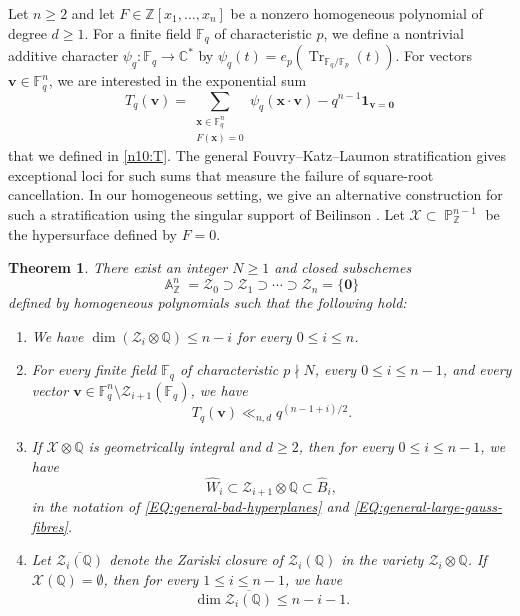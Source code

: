 \documentclass[a4paper,11pt, twoside,reqno]{amsart}
\theoremstyle{plain}
\newtheorem{thm}{Theorem}[section]
\theoremstyle{definition}
\theoremstyle{remark}
\newcommand{\F}{\mathbb{F}}
\newcommand{\bfv}{\bm{v}}
\newcommand{\bfx}{\bm{x}}
\newcommand{\ZZ}{\mathbb{Z}}
\newcommand{\QQ}{\mathbb{Q}}
\DeclareMathOperator{\Tr}{Tr}
\DeclareMathOperator{\A}{\mathbb{A}}
\DeclareMathOperator{\PP}{\mathbb{P}}
\renewcommand{\bar}{\overline}
\renewcommand{\le}{\leqslant}
\renewcommand{\leq}{\leqslant}
\renewcommand{\ge}{\geqslant}
\renewcommand{\geq}{\geqslant}
\newcommand{\FF}{\mathbb{F}}
\newcommand{\CC}{\mathbb{C}}
\newcommand{\cone}{\widehat}
\numberwithin{equation}{section}
\begin{document}
Let $n\geq 2$ and let $F\in\ZZ[x_1,\dots,x_n]$ be a nonzero homogeneous
polynomial of degree $d\geq1$.
For a finite field $\FF_q$ of characteristic $p$,
we define a nontrivial additive character $\psi_q\colon \FF_q\to \CC^\ast$
by $\psi_q(t)=e_p(\Tr_{\FF_q/\FF_p}(t))$.
For vectors $\bfv\in \FF_q^n$, we are interested in the exponential sum
\[
T_q(\bfv)
= \sum_{\substack{\bfx\in\FF_q^n\\F(\bfx)=0}}
\psi_q(\bfx\cdot\bfv)
-q^{n-1}\bm1_{\bfv=\bm0}
\]
that we defined in \eqref{n10:T}.
The general Fouvry--Katz--Laumon stratification \cite[Theorem~1.1]{FK01}
gives exceptional loci for such sums
that measure the failure of square-root cancellation.
In our homogeneous setting,
we give an alternative construction for such a stratification using
the singular support of Beilinson \cite{Bei}.
Let $\mathcal X\subset \PP^{n-1}_{\ZZ}$ be the hypersurface defined by $F=0$.

\begin{thm}\label{n10:ss}
There exist an integer $N\geq1$ and closed subschemes
\[
\A^n_\ZZ=\mathcal Z_0\supset \mathcal Z_1\supset\cdots\supset \mathcal Z_n=\{\bm0\}
\]
defined by homogeneous polynomials such that the following hold:
\begin{enumerate}
\item \label{item:strat-geom-dim-bound}
We have $\dim (\mathcal Z_i \otimes \QQ) \le n-i$ for every $0\le i\le n$.

\item \label{item:strat-fourier-bound}
For every finite field $\FF_q$
of characteristic $p\nmid N$, every $0\leq i\leq n-1$, and every
vector $\bfv\in \FF_q^n \setminus \mathcal Z_{i+1}(\FF_q)$, we have
\begin{equation}\label{eq:main-bound}
T_q(\bfv)\ll_{n,d} q^{(n-1+i)/2}.
\end{equation}

\item If $\mathcal X \otimes \QQ$ is geometrically integral
and $d\ge 2$, then for every $0\leq i\leq n-1$, we have
\begin{equation}
\label{EQ:nice-sandwich}
\cone W_i \subset \mathcal Z_{i+1} \otimes \QQ \subset \cone B_i,
\end{equation}
in the notation of \eqref{EQ:general-bad-hyperplanes}
and \eqref{EQ:general-large-gauss-fibres}.

\item Let $\bar{\mathcal Z_i(\QQ)}$ denote the Zariski closure of
$\mathcal Z_i(\QQ)$ in the variety $\mathcal Z_i \otimes \QQ$.
If $\mathcal X(\QQ)=\emptyset$, then for every $1\leq i\leq n-1$, we have
\begin{equation}\label{eq:rational-main}
\dim \bar{\mathcal Z_i(\QQ)}
\le n-i-1.
\end{equation}
\end{enumerate}
\end{thm}
\end{document}
